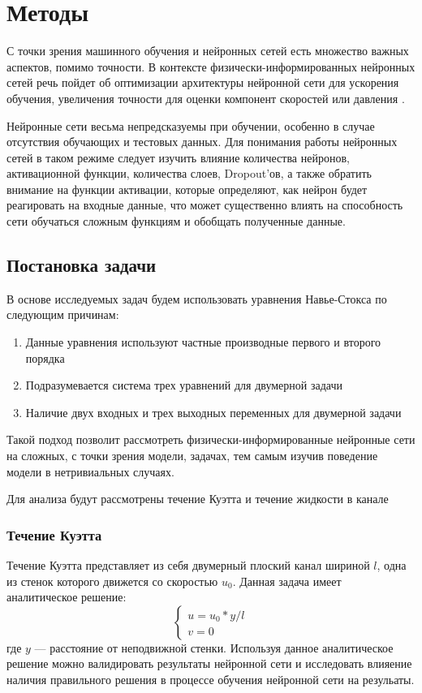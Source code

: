 \chapter{Методы}
С точки зрения машинного обучения и нейронных сетей есть множество важных аспектов,
помимо точности. В контексте физически-информированных нейронных сетей речь пойдет
об оптимизации архитектуры нейронной сети для ускорения обучения, увеличения точности
для оценки компонент скоростей или давления \cite{Tommaso2024pinn}.

Нейронные сети весьма непредсказуемы при обучении, особенно в случае отсутствия
обучающих и тестовых данных. Для понимания работы нейронных сетей в таком режиме
следует изучить влияние количества нейронов, активационной функции, количества слоев,
Dropout'ов, а также обратить внимание на функции активации, которые определяют,
как нейрон будет реагировать на входные данные, что может существенно влиять на способность
сети обучаться сложным функциям и обобщать полученные данные.
\section{Постановка задачи}
В основе исследуемых задач будем использовать уравнения Навье-Стокса по следующим
причинам:
\begin{enumerate}
    \item Данные уравнения используют частные производные первого и второго порядка
    \item Подразумевается система трех уравнений для двумерной задачи
    \item Наличие двух входных и трех выходных переменных для двумерной задачи
\end{enumerate}
Такой подход позволит рассмотреть физически-информированные нейронные сети на сложных,
с точки зрения модели, задачах, тем самым изучив поведение модели в нетривиальных случаях.

Для анализа будут рассмотрены течение Куэтта и течение жидкости в канале
\subsection{Течение Куэтта}


Течение Куэтта представляет из себя двумерный плоский канал шириной $l$, одна из стенок которого 
движется со скоростью $u_0$. Данная задача имеет аналитическое решение:
\begin{equation}
    \begin{cases}
        u = u_0 * y / l \\
        v = 0
    \end{cases}
\end{equation}
где $y$ --- расстояние от неподвижной стенки.
Используя данное аналитическое решение можно валидировать результаты нейронной сети и
исследовать влияение наличия правильного решения в процессе обучения нейронной сети на
резульаты.
